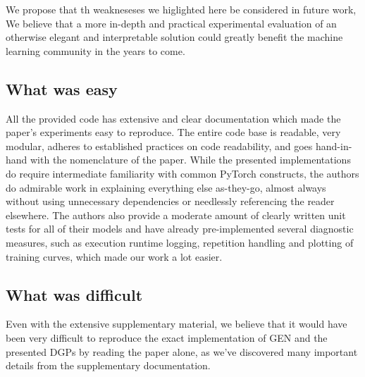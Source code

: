 We propose that th weakneseses we higlighted here be considered in future work, We believe that a more in-depth and practical experimental evaluation of an otherwise elegant and interpretable solution could greatly benefit the machine learning community in the years to come.


\subsection{What was easy}

All the provided code has extensive and clear documentation which made the paper's experiments easy to reproduce. The entire code base is readable, very modular, adheres to established practices on code readability, and goes hand-in-hand with the nomenclature of the paper. While the presented implementations do require intermediate familiarity with common PyTorch constructs, the authors do admirable work in explaining everything else as-they-go, almost always without using unnecessary dependencies or needlessly referencing the reader elsewhere. The authors also provide a moderate amount of clearly written unit tests for all of their models and have already pre-implemented several diagnostic measures, such as execution runtime logging, repetition handling and plotting of training curves, which made our work a lot easier.



\subsection{What was difficult}

Even with the extensive supplementary material, we believe that it would have been very difficult to reproduce the exact implementation of GEN and the presented DGPs by reading the paper alone, as we've discovered many important details from the supplementary documentation. 

